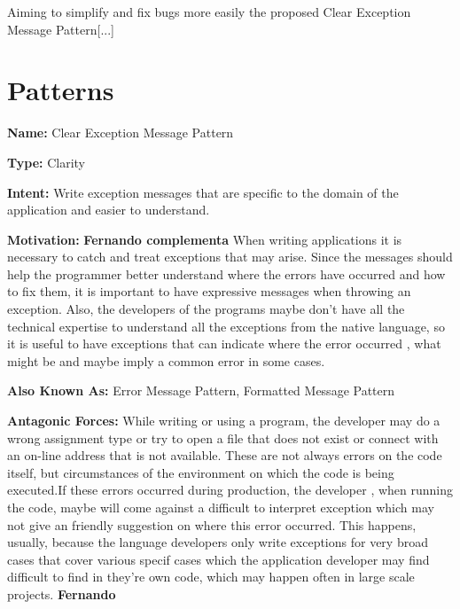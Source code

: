 \documentclass[12pt]{article}
\begin{document}
Aiming to simplify and fix bugs more easily the proposed Clear Exception Message Pattern[...]


\section{Patterns}
\begin{flushleft}
\textbf{Name:} Clear Exception Message Pattern\newline

\textbf{Type:}  Clarity \newline

\textbf{Intent:} Write exception messages that are specific to the domain of the application and easier to understand.\newline

\textbf{Motivation:} \textbf{Fernando complementa}
When writing applications it is necessary to catch and treat exceptions that may arise. Since the messages should help the programmer better understand where the errors have occurred and how to fix them, it is important to have expressive messages when throwing an exception. 
Also, the developers of the programs maybe don't have all the technical expertise to understand all the exceptions from the native language, so it is useful to have exceptions that can indicate where the error occurred , what might be and maybe imply a common error in some cases.\newline


\textbf{Also Known As:} Error Message Pattern, Formatted Message Pattern\newline

\textbf{Antagonic Forces:} While writing or using a program, the developer may do a wrong assignment type or try to open a file that does not exist or connect with an on-line address that is not available. These are not always errors on the code itself, but circumstances of the environment on which the code is being executed.If these errors occurred during production, the developer , when running the code, maybe will come against a difficult to interpret exception which may not give an friendly suggestion on where this error occurred. This happens, usually, because the language developers only write exceptions for very broad cases that cover various specif cases which the application developer may find difficult to find in they're own code, which may happen often in large scale projects.  \newline 
\textbf{Fernando}


\end{flushleft}
\end{document}
